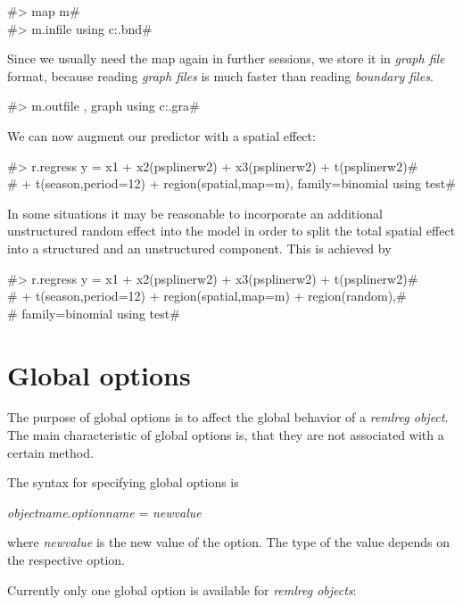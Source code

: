 #> map m# \\
#> m.infile using c:\maps\map.bnd#

Since we usually need the map again in further sessions, we store
it in {\em graph file} format, because reading {\em graph files}
is much faster than reading {\em boundary files}.

#> m.outfile , graph using c:\maps\mapgraph.gra#

We can now augment our predictor with a spatial effect:

 #> r.regress y = x1 + x2(psplinerw2) + x3(psplinerw2) + t(psplinerw2)#\\
 #  + t(season,period=12) + region(spatial,map=m), family=binomial using test#

In some situations it may be reasonable to incorporate  an
additional unstructured  random effect into the model in order to
split the total spatial effect into a structured and an unstructured
component. This is achieved by

#> r.regress y = x1 + x2(psplinerw2) + x3(psplinerw2) + t(psplinerw2)#\\
#  + t(season,period=12) + region(spatial,map=m) + region(random),#\\
#  family=binomial using test#

\section{Global options}
\label{remlregglobopt} 

The purpose of global options is to affect the global behavior of
a {\em remlreg object}. The main characteristic of global options
is, that they are not associated with a certain method.

The syntax for specifying global options is

{\em objectname}.{\em optionname} = {\em newvalue}

where {\em newvalue} is the new value of the option. The type of
the value depends on the respective option.

Currently only one global option is available for {\em remlreg
objects}:

